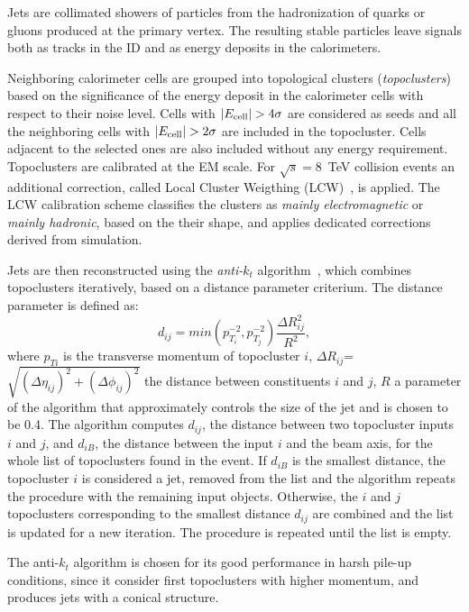 Jets are collimated showers of particles from the hadronization of
quarks or gluons produced at the primary vertex.
The resulting stable particles leave signals both as tracks in the ID
and as energy deposits in the calorimeters.

Neighboring calorimeter cells are grouped into topological clusters
({\it topoclusters}) based on the significance of the energy deposit
in the calorimeter cells with respect to their noise
level. Cells with $|E_{\rm cell}|>4\sigma$ are considered as seeds and
all the neighboring cells with $|E_{\rm cell}| > 2\sigma$ are included
in the topocluster. Cells adjacent to the selected ones are also
included without any energy requirement.
Topoclusters are calibrated at the EM scale. For $\sqrt{s} = $8~TeV
collision events an additional correction, called Local Cluster
Weigthing (LCW)~\cite{lcwcalib}, is applied. The LCW calibration
scheme classifies the clusters as {\it mainly electromagnetic} or
{\it mainly hadronic}, based on the their shape, and applies
dedicated corrections derived from simulation.

Jets are then reconstructed using the {\it anti-$k_t$}
algorithm~\cite{antiktalgo}, which combines topoclusters iteratively,
based on a distance parameter criterium. The distance parameter is
defined as:
\begin{equation}
d_{ij}=min(p_{T_i}^{-2},p_{T_j}^{-2})\frac{\Delta R_{ij}^{2}}{R^{2}},
\end{equation}
where $p_{Ti}$ is the transverse momentum of topocluster $i$, 
$\Delta R_{ij}$=$\sqrt{(\Delta\eta_{ij})^{2}+(\Delta\phi_{ij})^{2}}$ the distance 
between constituents $i$ and
$j$, $R$ a parameter of the algorithm that approximately controls the size
of the jet and is chosen to be 0.4.
The algorithm computes $d_{ij}$, the distance between two topocluster
inputs $i$ and $j$, and $d_{iB}$,  the distance between the input $i$
and the beam axis, for the whole list of topoclusters found in the
event. If $d_{iB}$ is the smallest distance, the
topocluster $i$ is considered a jet, removed from the list and the
algorithm repeats the procedure with the remaining input objects.
Otherwise, the $i$ and $j$ topoclusters corresponding to the smallest
distance $d_{ij}$ are combined and the list is updated for a new
iteration.
The procedure is repeated until the list is empty.

The anti-$k_t$ algorithm is chosen for its good performance 
in harsh pile-up conditions, since it consider first topoclusters 
with higher momentum, and produces jets with a conical
structure.


